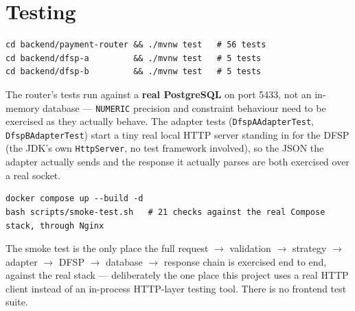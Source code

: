 \documentclass[12pt,a4paper]{article}
\begin{document}
\section{Testing}
\label{sec:testing}

\begin{lstlisting}
cd backend/payment-router && ./mvnw test   # 56 tests
cd backend/dfsp-a         && ./mvnw test   # 5 tests
cd backend/dfsp-b         && ./mvnw test   # 5 tests
\end{lstlisting}

The router's tests run against a \textbf{real PostgreSQL} on port 5433, not an
in-memory database --- \texttt{NUMERIC} precision and constraint behaviour need to be
exercised as they actually behave. The adapter tests (\texttt{DfspAAdapterTest},
\texttt{DfspBAdapterTest}) start a tiny real local HTTP server standing in for the
DFSP (the JDK's own \texttt{HttpServer}, no test framework involved), so the JSON the
adapter actually sends and the response it actually parses are both exercised over a
real socket.

\begin{lstlisting}
docker compose up --build -d
bash scripts/smoke-test.sh   # 21 checks against the real Compose stack, through Nginx
\end{lstlisting}

The smoke test is the only place the full request $\rightarrow$ validation
$\rightarrow$ strategy $\rightarrow$ adapter $\rightarrow$ DFSP $\rightarrow$
database $\rightarrow$ response chain is exercised end to end, against the real
stack --- deliberately the one place this project uses a real HTTP client instead of
an in-process HTTP-layer testing tool. There is no frontend test suite.
\end{document}
